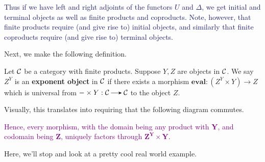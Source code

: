     \textcolor{MidnightBlue}{Thus if we have left and right adjoints
    of the functors $U$ and $\Delta$, we get initial and terminal
    objects as 
    well as finite products and coproducts. Note, however, that finite
    products require (and give rise to) initial objects, and similarly
    that finite coproducts require (and give rise to) terminal
    objects.} 

    Next, we make the following definition. 
    \begin{definition}
        Let $\mathcal{C}$ be a category with finite products. Suppose $Y, Z$ are 
        objects in $\mathcal{C}$. We say $Z^Y$ is an \textbf{exponent object} in
        $\mathcal{C}$ if there exists a morphism $\textbf{eval}: (Z^Y \times Y)
        \to Z$ which is universal from $-\times Y: \cc \to \cc$ to the
        object $Z$. 

        Visually, this translates into requiring that the following
        diagram commutes. 
        \begin{center}
            \hspace{1cm}
        \end{center}
    \end{definition}
    \textcolor{Purple}{Hence, every morphism,
    with the domain being any product with $\bm{Y}$, and codomain being
    $\bm{Z}$, uniquely factors through $\bm{Z^Y \times Y}$.}

    Here, we'll stop and look at a pretty cool real world example.

